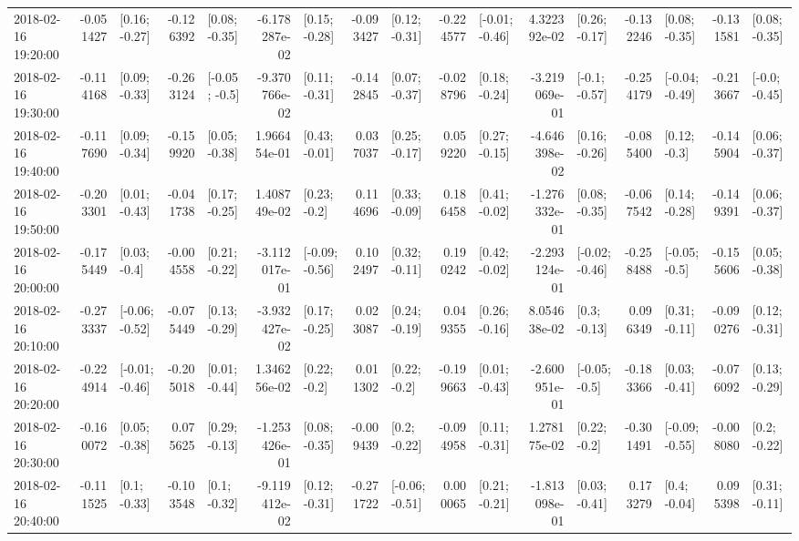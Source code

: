 \begin{tabular}{lrlrlrlrlrlrlrlrl}
2018-02-16 19:20:00 & -0.051427 &   [0.16; -0.27] & -0.126392 &   [0.08; -0.35] & -6.178287e-02 &   [0.15; -0.28] & -0.093427 &   [0.12; -0.31] & -0.224577 &  [-0.01; -0.46] &  4.322392e-02 &   [0.26; -0.17] & -0.132246 &   [0.08; -0.35] & -0.131581 &   [0.08; -0.35] \\
2018-02-16 19:30:00 & -0.114168 &   [0.09; -0.33] & -0.263124 &   [-0.05; -0.5] & -9.370766e-02 &   [0.11; -0.31] & -0.142845 &   [0.07; -0.37] & -0.028796 &   [0.18; -0.24] & -3.219069e-01 &   [-0.1; -0.57] & -0.254179 &  [-0.04; -0.49] & -0.213667 &   [-0.0; -0.45] \\
2018-02-16 19:40:00 & -0.117690 &   [0.09; -0.34] & -0.159920 &   [0.05; -0.38] &  1.966454e-01 &   [0.43; -0.01] &  0.037037 &   [0.25; -0.17] &  0.059220 &   [0.27; -0.15] & -4.646398e-02 &   [0.16; -0.26] & -0.085400 &    [0.12; -0.3] & -0.145904 &   [0.06; -0.37] \\
2018-02-16 19:50:00 & -0.203301 &   [0.01; -0.43] & -0.041738 &   [0.17; -0.25] &  1.408749e-02 &    [0.23; -0.2] &  0.114696 &   [0.33; -0.09] &  0.186458 &   [0.41; -0.02] & -1.276332e-01 &   [0.08; -0.35] & -0.067542 &   [0.14; -0.28] & -0.149391 &   [0.06; -0.37] \\
2018-02-16 20:00:00 & -0.175449 &    [0.03; -0.4] & -0.004558 &   [0.21; -0.22] & -3.112017e-01 &  [-0.09; -0.56] &  0.102497 &   [0.32; -0.11] &  0.190242 &   [0.42; -0.02] & -2.293124e-01 &  [-0.02; -0.46] & -0.258488 &   [-0.05; -0.5] & -0.155606 &   [0.05; -0.38] \\
2018-02-16 20:10:00 & -0.273337 &  [-0.06; -0.52] & -0.075449 &   [0.13; -0.29] & -3.932427e-02 &   [0.17; -0.25] &  0.023087 &   [0.24; -0.19] &  0.049355 &   [0.26; -0.16] &  8.054638e-02 &    [0.3; -0.13] &  0.096349 &   [0.31; -0.11] & -0.090276 &   [0.12; -0.31] \\
2018-02-16 20:20:00 & -0.224914 &  [-0.01; -0.46] & -0.205018 &   [0.01; -0.44] &  1.346256e-02 &    [0.22; -0.2] &  0.011302 &    [0.22; -0.2] & -0.199663 &   [0.01; -0.43] & -2.600951e-01 &   [-0.05; -0.5] & -0.183366 &   [0.03; -0.41] & -0.076092 &   [0.13; -0.29] \\
2018-02-16 20:30:00 & -0.160072 &   [0.05; -0.38] &  0.075625 &   [0.29; -0.13] & -1.253426e-01 &   [0.08; -0.35] & -0.009439 &    [0.2; -0.22] & -0.094958 &   [0.11; -0.31] &  1.278175e-02 &    [0.22; -0.2] & -0.301491 &  [-0.09; -0.55] & -0.008080 &    [0.2; -0.22] \\
2018-02-16 20:40:00 & -0.111525 &    [0.1; -0.33] & -0.103548 &    [0.1; -0.32] & -9.119412e-02 &   [0.12; -0.31] & -0.271722 &  [-0.06; -0.51] &  0.000065 &   [0.21; -0.21] & -1.813098e-01 &   [0.03; -0.41] &  0.173279 &    [0.4; -0.04] &  0.095398 &   [0.31; -0.11] \\

\end{tabular}
